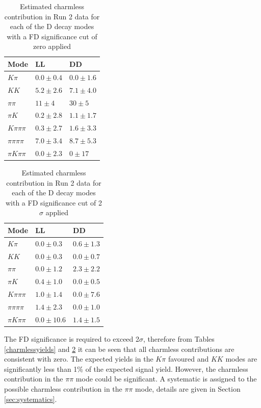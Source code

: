 \begin{table}[h] 
\centering 
\begin{tabular}{lll} 
\hline 
Mode & LL & DD \\ 
\hline 
$K\pi$ & $0.0 \pm 0.4$ & $0.0 \pm 1.6$ \\ 
$KK$ & $5.2 \pm 2.6$ & $7.1 \pm 4.0$ \\ 
$\pi\pi$ & $11 \pm 4$ & $30 \pm 5$ \\ 
$\pi K$ & $0.2 \pm 2.8$ & $1.1 \pm 1.7$ \\ 
$K\pi\pi\pi$ & $0.3 \pm 2.7$ & $1.6 \pm 3.3$ \\ 
$\pi\pi\pi\pi$ & $7.0 \pm 3.4$ & $8.7 \pm 5.3$ \\ 
$\pi K \pi\pi$ & $0.0 \pm 2.3$ & $0 \pm 17$ \\ 
\hline 
\end{tabular} 
\caption{Estimated charmless contribution in Run 2 data for each of the D decay modes with a FD significance cut of zero applied} 
\label{charmlessyieldsnofdRun2} 
\end{table}

\begin{table}[h] 
\centering 
\begin{tabular}{lll} 
\hline 
Mode & LL & DD \\ 
\hline 
$K\pi$ & $0.0 \pm 0.3$ & $0.6 \pm 1.3$ \\ 
$KK$ & $0.0 \pm 0.3$ & $0.0 \pm 0.7$ \\ 
$\pi\pi$ & $0.0 \pm 1.2$ & $2.3 \pm 2.2$ \\ 
$\pi K$ & $0.4 \pm 1.0$ & $0.0 \pm 0.5$ \\ 
$K\pi\pi\pi$ & $1.0 \pm 1.4$ & $0.0 \pm 7.6$ \\ 
$\pi\pi\pi\pi$ & $1.4 \pm 2.3$ & $0.0 \pm 1.0$ \\ 
$\pi K \pi\pi$ & $0.0 \pm 10.6$ & $1.4 \pm 1.5$ \\ 
\hline 
\end{tabular} 
\caption{Estimated charmless contribution in Run 2 data for each of the D decay modes with a FD significance cut of 2$\sigma$ applied} 
\label{charmlessyieldsRun2}
\end{table}

The \Dz FD significance is required to exceed 2$\sigma$, therefore from Tables \ref{charmlessyields} and \ref{charmlessyieldsRun2} it can be seen that all charmless contributions are consistent with zero. The expected yields in the $K\pi$ favoured and $KK$ modes are significantly less than 1\% of the expected signal yield. However, the charmless contribution in the $\pi\pi$ mode could be significant. A systematic is assigned to the possible charmless contribution in the $\pi\pi$ mode, details are given in Section \ref{sec:systematics}. 

